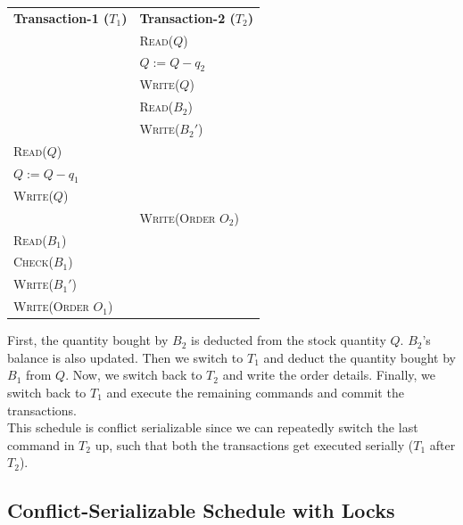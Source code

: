 \documentclass[12pt]{report}
\begin{document}
    \begin{center}
        \begin{adjustbox}{width=\textwidth}
            \begin{tabularx}{\textwidth}{|X|X|}
            \hline
            \multirow{2}{*}{\textbf{Transaction-1 ($T_{1}$)}} & \multirow{2}{*}{\textbf{Transaction-2 ($T_{2}$)}} \\
            & \\ \hline
            & \textsc{Read($Q$)} \\
            & \textsc{$Q := Q - q_{2}$} \\
            & \textsc{Write($Q$)} \\
            & \textsc{Read($B_{2}$)} \\
            & \textsc{Write($B_{2}'$)} \\
            \textsc{Read($Q$)} & \\
            \textsc{$Q := Q - q_{1}$} & \\
            \textsc{Write($Q$)} & \\
            & \textsc{Write(Order $O_{2}$)} \\
            \textsc{Read($B_{1}$)} & \\
            \textsc{Check($B_{1}$)} & \\
            \textsc{Write($B_{1}'$)} & \\
            \textsc{Write(Order $O_{1}$)} & \\
            \hline
            \end{tabularx}
        \end{adjustbox}
    \end{center}
    \vspace*{10pt}
    First, the quantity bought by $B_{2}$ is deducted from the stock quantity $Q$. $B_{2}$'s balance is also updated.
    Then we switch to $T_{1}$ and deduct the quantity bought by $B_{1}$ from $Q$. Now, we switch back to $T_{2}$ and write the order details.
    Finally, we switch back to $T_{1}$ and execute the remaining commands and commit the transactions.
    \vspace*{10pt} \\
    This schedule is conflict serializable since we can repeatedly switch the last command in $T_{2}$ up, such that both the transactions
    get executed serially ($T_{1}$ after $T_{2}$).

    \subsection*{Conflict-Serializable Schedule with Locks}
\end{document}
